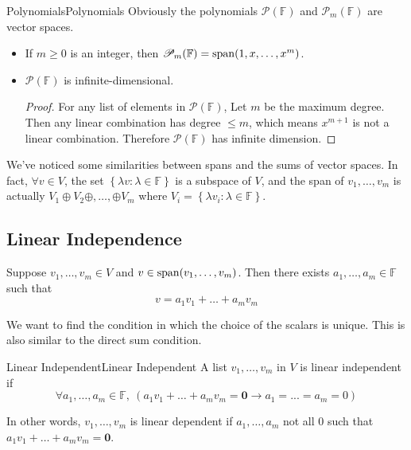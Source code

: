 \documentclass[../main.tex]{subfiles}
\begin{document}
\begin{example}{Polynomials}{Polynomials}
	Obviously the polynomials $\mathscr{P}(\mathbb{F})$ and $\mathscr{P}_m(\mathbb{F})$ are vector spaces.

\begin{itemize}
	\item If $m\geq 0$ is an integer, then $\mathscr{P}_m(\mathbb{F}) = \operatorname{span}(1,x, \ldots ,x^m)$.
	\item $\mathscr{P}(\mathbb{F})$ is infinite-dimensional. 

		\begin{proof}
			For any list of elements in $\mathscr{P}(\mathbb{F})$, Let $m$ be the maximum degree. Then any linear combination has degree  $\leq m$, which means $x^{m+1}$ is not a linear combination. Therefore $\mathscr{P}(\mathbb{F})$ has infinite dimension.
		\end{proof}
\end{itemize}
\end{example}
\begin{remark}
We've noticed some similarities between spans and the sums of vector spaces. In fact, $\forall v \in V$, the set $\left\{ \lambda v: \lambda \in \mathbb{F} \right\}$ is a subspace of $V$, and the span of $v_1, \ldots ,v_m$ is actually $V_1\oplus V_2 \oplus , \ldots ,\oplus V_m$ where $V_i = \left\{ \lambda v_i : \lambda \in \mathbb{F} \right\}$. 
\end{remark}

\subsection{Linear Independence}
Suppose $v_1, \ldots ,v_m \in V$ and $v \in \operatorname{span}(v_1, \ldots ,v_m)$. Then there exists $a_1, \ldots ,a_m \in \mathbb{F}$ such that
\begin{equation*}
v = a_1v_1+\ldots +a_mv_m
\end{equation*}

We want to find the condition in which the choice of the scalars is unique. This is also similar to the direct sum condition.

\begin{definition}{Linear Independent}{Linear Independent}
A list $v_1, \ldots ,v_m$ in $V$ is linear independent if
\begin{equation*}
\forall a_1, \ldots ,a_m \in \mathbb{F},\ (a_1v_1+\ldots +a_mv_m = \boldsymbol{0} \rightarrow a_1=...=a_m=0)
\end{equation*}

In other words, $v_1, \ldots ,v_m$ is linear dependent if $a_1, \ldots ,a_m$ not all $0$ such that $a_1v_1+\ldots +a_mv_m=\boldsymbol{0}$.
\end{definition}
\end{document}
